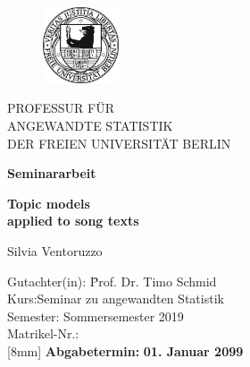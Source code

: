\thispagestyle{empty}

\begin{center}

\vspace*{-10mm}

\begin{figure}[h]
	\centering
		\includegraphics[width=0.20\textwidth]{./Bilder/fu_logo.pdf}
\end{figure}

\vspace*{-10mm}

{\LARGE PROFESSUR FÜR \\ANGEWANDTE STATISTIK\\[1mm]}
DER FREIEN UNIVERSITÄT BERLIN\\

\vspace*{3cm}


{\Large \textbf{Seminararbeit}}\\ 

\vspace{1cm}

{\Large \textbf{Topic models}}\\ 
\vspace*{1mm}
{\Large \textbf{applied to song texts}}\\ 
\vspace*{1mm}

\vspace{3.5cm}

{\LARGE Silvia Ventoruzzo}\\[15mm]

\parbox{120mm}{
\begin{large}
\begin{tabbing}
Gutachter(in): \hspace{.7cm} \=Prof. Dr. Timo Schmid\\[4mm]
Kurs:\>Seminar zu angewandten Statistik\\
Semester:\> Sommersemester 2019\\
Matrikel-Nr.:\\
[8mm]
\textbf{Abgabetermin:} \> \textbf{01. Januar 2099}\\
\end{tabbing}
\end{large}
}

\end{center}
\clearpage{\pagestyle{empty}\cleardoublepage}
